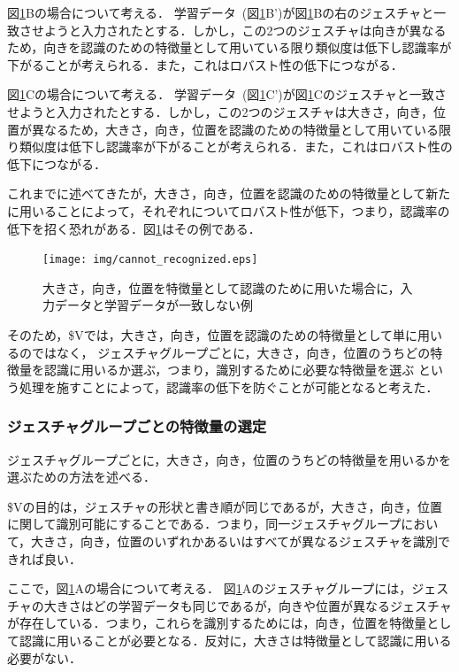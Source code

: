 図\ref{fig:cannot_recognized}Bの場合について考える．
学習データ~(図\ref{fig:cannot_recognized}B')が図\ref{fig:cannot_recognized}Bの右のジェスチャと一致させようと入力されたとする．しかし，この2つのジェスチャは向きが異なるため，向きを認識のための特徴量として用いている限り類似度は低下し認識率が下がることが考えられる．また，これはロバスト性の低下につながる．

図\ref{fig:cannot_recognized}Cの場合について考える．
学習データ~(図\ref{fig:cannot_recognized}C')が図\ref{fig:cannot_recognized}Cのジェスチャと一致させようと入力されたとする．しかし，この2つのジェスチャは大きさ，向き，位置が異なるため，大きさ，向き，位置を認識のための特徴量として用いている限り類似度は低下し認識率が下がることが考えられる．また，これはロバスト性の低下につながる．

これまでに述べてきたが，大きさ，向き，位置を認識のための特徴量として新たに用いることによって，それぞれについてロバスト性が低下，つまり，認識率の低下を招く恐れがある．図\ref{fig:cannot_recognized}はその例である．

\begin{figure} [h!]
	\begin{center}
		\texttt{[image: img/cannot\_recognized.eps]}
	\end{center}
	\caption{大きさ，向き，位置を特徴量として認識のために用いた場合に，入力データと学習データが一致しない例}
	\label{fig:cannot_recognized}
\end{figure}

そのため，\$Vでは，大きさ，向き，位置を認識のための特徴量として単に用いるのではなく，
ジェスチャグループごとに，大きさ，向き，位置のうちどの特徴量を認識に用いるか選ぶ，つまり，識別するために必要な特徴量を選ぶ
という処理を施すことによって，認識率の低下を防ぐことが可能となると考えた．

\subsubsection{ジェスチャグループごとの特徴量の選定}
ジェスチャグループごとに，大きさ，向き，位置のうちどの特徴量を用いるかを選ぶための方法を述べる．

\$Vの目的は，ジェスチャの形状と書き順が同じであるが，大きさ，向き，位置に関して識別可能にすることである．つまり，同一ジェスチャグループにおいて，大きさ，向き，位置のいずれかあるいはすべてが異なるジェスチャを識別できれば良い．

ここで，図\ref{fig:cannot_recognized}Aの場合について考える．
図\ref{fig:cannot_recognized}Aのジェスチャグループには，ジェスチャの大きさはどの学習データも同じであるが，向きや位置が異なるジェスチャが存在している．つまり，これらを識別するためには，向き，位置を特徴量として認識に用いることが必要となる．反対に，大きさは特徴量として認識に用いる必要がない．

